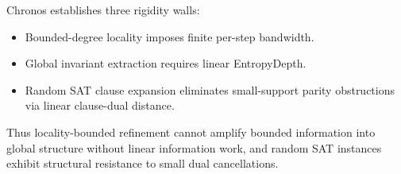 \documentclass[11pt]{article}
\begin{document}
Chronos establishes three rigidity walls:

\begin{itemize}
\item Bounded-degree locality imposes finite per-step bandwidth.
\item Global invariant extraction requires linear EntropyDepth.
\item Random SAT clause expansion eliminates small-support
parity obstructions via linear clause-dual distance.
\end{itemize}

Thus locality-bounded refinement cannot amplify bounded information
into global structure without linear information work,
and random SAT instances exhibit structural resistance
to small dual cancellations.


\end{document}
